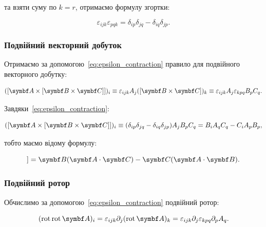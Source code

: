 та взяти суму по \( k = r \), отримаємо формулу згортки:

\begin{equation}
\varepsilon_{ijk} \varepsilon_{pqk} = \delta_{ip} \delta_{jq} - \delta_{iq} \delta_{jp}.
\label{eq:epsilon_contraction}
\end{equation}

\subsubsection{Подвійний векторний добуток}

Отримаємо за допомогою~\eqref{eq:epsilon_contraction} правило для подвійного векторного добутку:

\begin{equation*}
([\vect{A} \times [\Bfield \times \vect{C}]])_i \equiv \varepsilon_{ijk} A_j ([\Bfield \times \vect{C}])_k \equiv \varepsilon_{ijk} A_j
\varepsilon_{kpq} B_p C_q.
\end{equation*}

Завдяки~\eqref{eq:epsilon_contraction}:

\begin{equation*}
([\vect{A} \times [\Bfield \times \vect{C}]])_i \equiv (\delta_{ip} \delta_{jq} - \delta_{iq} \delta_{jp}) A_j B_p C_q = B_i A_q C_q - C_i A_p B_p,
\end{equation*}

тобто маємо відому формулу:

\begin{equation*}
[\vect{A} \times [\Bfield \times \vect{C}]] = \Bfield(\vect{A} \cdot \vect{C}) - \vect{C}(\vect{A} \cdot \Bfield).
\end{equation*}


\subsubsection{Подвійний ротор}

Обчислимо за допомогою~\eqref{eq:epsilon_contraction} подвійний ротор:

\begin{equation*}
(\Rot \Rot \vect{A})_i = \varepsilon_{ijk} \partial_j (\Rot \vect{A})_k = \varepsilon_{ijk} \partial_j \varepsilon_{kpq} \partial_p A_q.
\end{equation*}


